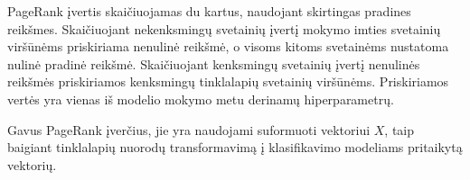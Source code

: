 PageRank įvertis skaičiuojamas du kartus, naudojant skirtingas pradines reikšmes. Skaičiuojant nekenksmingų svetainių įvertį mokymo imties svetainių viršūnėms priskiriama nenulinė reikšmė, o visoms kitoms svetainėms nustatoma nulinė pradinė reikšmė. Skaičiuojant kenksmingų svetainių įvertį nenulinės reikšmės priskiriamos kenksmingų tinklalapių svetainių viršūnėms. Priskiriamos vertės yra vienas iš modelio mokymo metu derinamų hiperparametrų.

Gavus PageRank įverčius, jie yra naudojami suformuoti vektoriui $X$, taip baigiant tinklalapių nuorodų transformavimą į klasifikavimo modeliams pritaikytą vektorių.
